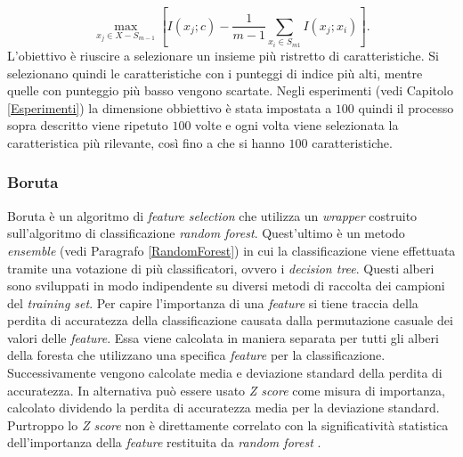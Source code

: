 \documentclass[12pt,italian]{report}
\begin{document}
	\begin{equation}
		\max_{x_j \in X- S_{m-1}} \left[I(x_j;c) - \frac{1}{m-1} \sum_{x_i \in S_{m1}}^{} I(x_j;x_i)\right].
	\end{equation}
	L'obiettivo è riuscire a selezionare un insieme più ristretto di caratteristiche. Si selezionano quindi le caratteristiche con i punteggi di indice più alti, mentre quelle con punteggio più basso vengono scartate. Negli esperimenti (vedi Capitolo \ref{Esperimenti}) la dimensione obbiettivo è stata impostata a $100$ quindi il processo sopra descritto viene ripetuto $100$ volte e ogni volta viene selezionata la caratteristica più rilevante, così fino a che si hanno $100$
	caratteristiche.

	\subsubsection{Boruta}
	\label{boruta}
	Boruta \cite{JSSv036i11} è un algoritmo di \textit{feature selection} che utilizza un \textit{wrapper} costruito sull'algoritmo di classificazione \textit{random forest}. Quest'ultimo è un metodo \textit{ensemble} (vedi Paragrafo \ref{RandomForest}) in cui la classificazione viene effettuata tramite una votazione di più classificatori, ovvero i \textit{decision tree}. Questi alberi sono sviluppati in modo indipendente su diversi metodi di raccolta dei campioni del \textit{training set}. Per capire l'importanza di una \textit{feature} si tiene traccia della perdita di accuratezza della classificazione causata dalla permutazione casuale dei valori delle \textit{feature}. Essa viene calcolata in maniera separata per tutti gli alberi della foresta che utilizzano una specifica \textit{feature} per la classificazione.
	Successivamente vengono calcolate media e deviazione standard della perdita di accuratezza. In alternativa può essere usato \textit{Z score} come misura di importanza, calcolato dividendo la perdita di accuratezza media per la deviazione standard. Purtroppo lo \textit{Z score} non è direttamente correlato con la significatività statistica dell'importanza della \textit{feature} restituita da \textit{random forest} \cite{10.1007/11908029_58}.
	
\end{document}
